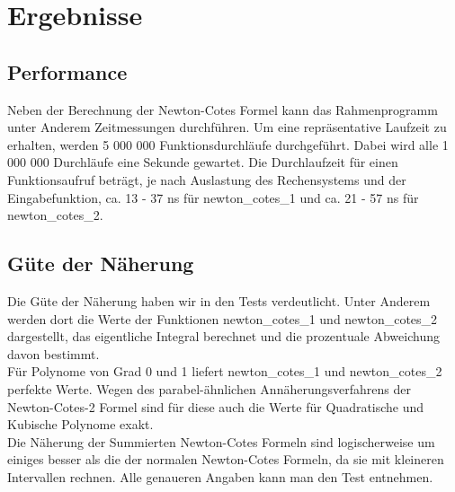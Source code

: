 \documentclass[course=erap]{aspdoc}
\begin{document}
\section{Ergebnisse}
\subsection{Performance}
Neben der Berechnung der Newton-Cotes Formel kann das Rahmenprogramm unter Anderem Zeitmessungen durchführen. Um eine repräsentative Laufzeit zu erhalten, werden 5 000 000 Funktionsdurchläufe durchgeführt. Dabei wird alle 1 000 000 Durchläufe eine Sekunde gewartet. Die Durchlaufzeit für einen Funktionsaufruf beträgt, je nach Auslastung des Rechensystems und der Eingabefunktion, ca. 13 - 37 ns für newton\_cotes\_1 und ca. 21 - 57 ns für newton\_cotes\_2. \\

\subsection{Güte der Näherung}
Die Güte der Näherung haben wir in den Tests verdeutlicht. Unter Anderem werden dort die Werte der Funktionen newton\_cotes\_1 und newton\_cotes\_2 dargestellt, das eigentliche Integral berechnet und die prozentuale Abweichung davon bestimmt.\\
Für Polynome von Grad 0 und 1 liefert newton\_cotes\_1 und newton\_cotes\_2 perfekte Werte. Wegen des parabel-ähnlichen Annäherungsverfahrens der Newton-Cotes-2 Formel sind für diese auch die Werte für Quadratische und Kubische Polynome exakt.\\
Die Näherung der Summierten Newton-Cotes Formeln sind logischerweise um einiges besser als die der normalen Newton-Cotes Formeln, da sie mit kleineren Intervallen rechnen. Alle genaueren Angaben kann man den Test entnehmen.
\end{document}
